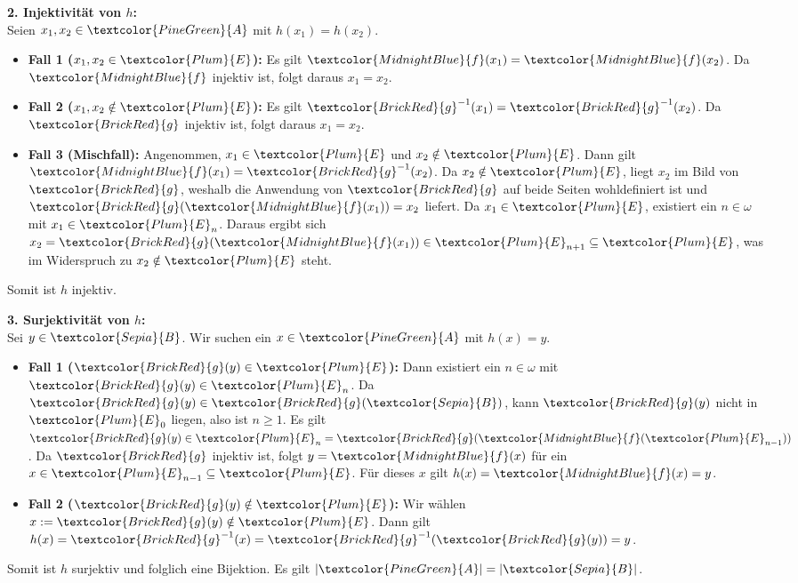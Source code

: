 \begin{math-stroke}
\begin{short-proof}
\textbf{2. Injektivität von $h$:} \\
Seien $x_1, x_2 \in \textcolor{PineGreen}{A}$ mit $h(x_1) = h(x_2)$.
\begin{itemize}
    \item \textbf{Fall 1 ($x_1, x_2 \in \textcolor{Plum}{E}$):} Es gilt $\textcolor{MidnightBlue}{f}(x_1) = \textcolor{MidnightBlue}{f}(x_2)$. Da $\textcolor{MidnightBlue}{f}$ injektiv ist, folgt daraus $x_1 = x_2$.
    \item \textbf{Fall 2 ($x_1, x_2 \notin \textcolor{Plum}{E}$):} Es gilt $\textcolor{BrickRed}{g}^{-1}(x_1) = \textcolor{BrickRed}{g}^{-1}(x_2)$. Da $\textcolor{BrickRed}{g}$ injektiv ist, folgt daraus $x_1 = x_2$.
    \item \textbf{Fall 3 (Mischfall):} Angenommen, $x_1 \in \textcolor{Plum}{E}$ und $x_2 \notin \textcolor{Plum}{E}$. Dann gilt $\textcolor{MidnightBlue}{f}(x_1) = \textcolor{BrickRed}{g}^{-1}(x_2)$. Da $x_2 \notin \textcolor{Plum}{E}$, liegt $x_2$ im Bild von $\textcolor{BrickRed}{g}$, weshalb die Anwendung von $\textcolor{BrickRed}{g}$ auf beide Seiten wohldefiniert ist und $\textcolor{BrickRed}{g}(\textcolor{MidnightBlue}{f}(x_1)) = x_2$ liefert. Da $x_1 \in \textcolor{Plum}{E}$, existiert ein $n \in \omega$ mit $x_1 \in \textcolor{Plum}{E}_n$. Daraus ergibt sich $x_2 = \textcolor{BrickRed}{g}(\textcolor{MidnightBlue}{f}(x_1)) \in \textcolor{Plum}{E}_{n+1} \subseteq \textcolor{Plum}{E}$, was im Widerspruch zu $x_2 \notin \textcolor{Plum}{E}$ steht.
\end{itemize}
Somit ist $h$ injektiv.

\textbf{3. Surjektivität von $h$:} \\
Sei $y \in \textcolor{Sepia}{B}$. Wir suchen ein $x \in \textcolor{PineGreen}{A}$ mit $h(x) = y$.
\begin{itemize}
    \item \textbf{Fall 1 ($\textcolor{BrickRed}{g}(y) \in \textcolor{Plum}{E}$):} Dann existiert ein $n \in \omega$ mit $\textcolor{BrickRed}{g}(y) \in \textcolor{Plum}{E}_n$. Da $\textcolor{BrickRed}{g}(y) \in \textcolor{BrickRed}{g}(\textcolor{Sepia}{B})$, kann $\textcolor{BrickRed}{g}(y)$ nicht in $\textcolor{Plum}{E}_0$ liegen, also ist $n \ge 1$. Es gilt $\textcolor{BrickRed}{g}(y) \in \textcolor{Plum}{E}_n = \textcolor{BrickRed}{g}(\textcolor{MidnightBlue}{f}(\textcolor{Plum}{E}_{n-1}))$. Da $\textcolor{BrickRed}{g}$ injektiv ist, folgt $y = \textcolor{MidnightBlue}{f}(x)$ für ein $x \in \textcolor{Plum}{E}_{n-1} \subseteq \textcolor{Plum}{E}$. Für dieses $x$ gilt $h(x) = \textcolor{MidnightBlue}{f}(x) = y$.
    \item \textbf{Fall 2 ($\textcolor{BrickRed}{g}(y) \notin \textcolor{Plum}{E}$):} Wir wählen $x := \textcolor{BrickRed}{g}(y) \notin \textcolor{Plum}{E}$. Dann gilt $h(x) = \textcolor{BrickRed}{g}^{-1}(x) = \textcolor{BrickRed}{g}^{-1}(\textcolor{BrickRed}{g}(y)) = y$.
\end{itemize}
Somit ist $h$ surjektiv und folglich eine Bijektion. Es gilt $|\textcolor{PineGreen}{A}| = |\textcolor{Sepia}{B}|$.
\end{short-proof}
\end{math-stroke}

